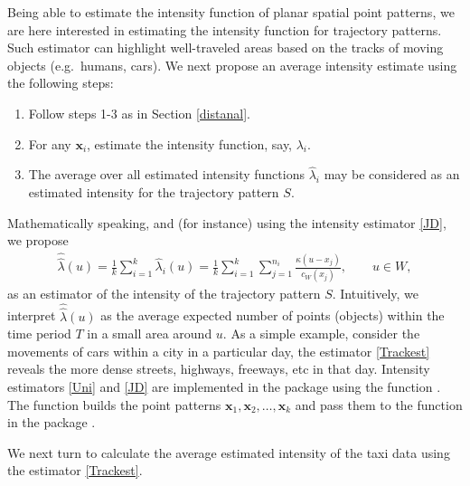 \documentclass[article]{jss}
\begin{document}
  Being able to estimate the intensity function of planar spatial point patterns, we are here interested in estimating the intensity function for trajectory patterns. Such estimator can highlight well-traveled areas based on the tracks of moving objects (e.g.\ humans, cars). We next propose an average intensity estimate using the following steps:
  \begin{leftbar}
  \begin{enumerate}
  \item Follow steps 1-3 as in Section \ref{distanal}.
  \item For any $\textbf{x}_i$, estimate the intensity function, say, $\lambda_i$.
  \item The average over all estimated intensity functions $\widehat{\lambda}_i$ may be considered as an estimated intensity for the trajectory pattern $S$.
  \end{enumerate}
  \end{leftbar}
  Mathematically speaking, and (for instance) using the intensity estimator \eqref{JD}, we propose
  \begin{eqnarray}\label{Trackest}
  \widehat{\widehat{\lambda}}(u)=\frac{1}{k} \sum\limits_{i=1}^{k} \widehat{\lambda}_i(u) =\frac{1}{k}\sum\limits_{i=1}^{k} \sum\limits_{j=1}^{n_i} \frac{\kappa(u-x_j)}{c_W(x_j)}, \qquad u \in W,
  \end{eqnarray}
  as an estimator of the intensity of the trajectory pattern $S$. Intuitively, we interpret $\widehat{\widehat{\lambda}}(u)$ as the average expected number of points (objects) within the time period $T$ in a small area around $u$. As a simple example, consider the movements of cars within a city in a particular day, the estimator \eqref{Trackest} reveals the more dense streets, highways, freeways, etc in that day. Intensity estimators \eqref{Uni} and \eqref{JD} are implemented in the  package using the function . The function  builds the point patterns $\textbf{x}_1,\textbf{x}_2, \ldots, \textbf{x}_k$ and pass them to the function  in the package .

We next turn to calculate the average estimated intensity of the taxi data using the estimator \eqref{Trackest}.
\end{document}
